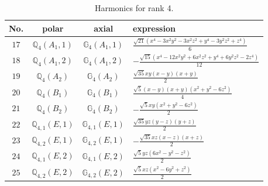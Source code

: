 \documentclass[fleqn,8pt,landscape]{jsarticle}
\begin{document}
\begin{table}[ht!]
\begin{center}
\caption{Harmonics for rank 4.}
\renewcommand{\arraystretch}{1.3}
\begin{tabular}{cccl} \hline \hline
No. & polar & axial & expression \\ \hline
$ 17 $ & $ \mathbb{Q}_{4}(A_{1},1) $ & $ \mathbb{G}_{4}(A_{1},1) $ & $ \frac{\sqrt{21} \left(x^{4} - 3 x^{2} y^{2} - 3 x^{2} z^{2} + y^{4} - 3 y^{2} z^{2} + z^{4}\right)}{6} $ \\
$ 18 $ & $ \mathbb{Q}_{4}(A_{1},2) $ & $ \mathbb{G}_{4}(A_{1},2) $ & $ - \frac{\sqrt{15} \left(x^{4} - 12 x^{2} y^{2} + 6 x^{2} z^{2} + y^{4} + 6 y^{2} z^{2} - 2 z^{4}\right)}{12} $ \\
$ 19 $ & $ \mathbb{Q}_{4}(A_{2}) $ & $ \mathbb{G}_{4}(A_{2}) $ & $ \frac{\sqrt{35} x y \left(x - y\right) \left(x + y\right)}{2} $ \\
$ 20 $ & $ \mathbb{Q}_{4}(B_{1}) $ & $ \mathbb{G}_{4}(B_{1}) $ & $ \frac{\sqrt{5} \left(x - y\right) \left(x + y\right) \left(x^{2} + y^{2} - 6 z^{2}\right)}{4} $ \\
$ 21 $ & $ \mathbb{Q}_{4}(B_{2}) $ & $ \mathbb{G}_{4}(B_{2}) $ & $ - \frac{\sqrt{5} x y \left(x^{2} + y^{2} - 6 z^{2}\right)}{2} $ \\
$ 22 $ & $ \mathbb{Q}_{4,1}(E,1) $ & $ \mathbb{G}_{4,1}(E,1) $ & $ \frac{\sqrt{35} y z \left(y - z\right) \left(y + z\right)}{2} $ \\
$ 23 $ & $ \mathbb{Q}_{4,2}(E,1) $ & $ \mathbb{G}_{4,2}(E,1) $ & $ - \frac{\sqrt{35} x z \left(x - z\right) \left(x + z\right)}{2} $ \\
$ 24 $ & $ \mathbb{Q}_{4,1}(E,2) $ & $ \mathbb{G}_{4,1}(E,2) $ & $ \frac{\sqrt{5} y z \left(6 x^{2} - y^{2} - z^{2}\right)}{2} $ \\
$ 25 $ & $ \mathbb{Q}_{4,2}(E,2) $ & $ \mathbb{G}_{4,2}(E,2) $ & $ \frac{\sqrt{5} x z \left(x^{2} - 6 y^{2} + z^{2}\right)}{2} $ \\
 \hline \hline
\end{tabular}
\end{center}
\end{table}
\end{document}
